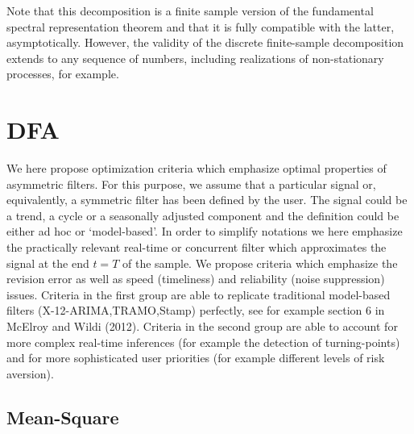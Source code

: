 \documentclass[11pt]{article}
\begin{document}
Note that this decomposition is a finite sample version of the fundamental spectral representation theorem and that it is fully compatible with the latter, asymptotically. However, the validity of the discrete finite-sample decomposition extends to any sequence of numbers, including realizations of non-stationary processes, for example.



\section{DFA}\label{ddf}

We here propose optimization criteria which emphasize optimal properties of asymmetric filters. For this purpose, we assume that a particular signal or, equivalently, a symmetric filter has been defined by the user. The signal could be a trend, a cycle or a seasonally adjusted component and the definition could be either ad hoc or `model-based'. In order to simplify notations we here emphasize the practically relevant real-time or concurrent filter which approximates the signal at the end $t=T$ of the sample. We propose criteria which emphasize the revision error as well as speed (timeliness) and reliability (noise suppression) issues. Criteria in the first group are able to replicate traditional model-based filters (X-12-ARIMA,TRAMO,Stamp) perfectly, see for example section 6 in McElroy and Wildi (2012). Criteria in the second group are able to account for more complex real-time inferences (for example the detection of turning-points) and for more sophisticated user priorities (for example different levels of risk aversion).

\subsection{Mean-Square}
\end{document}
